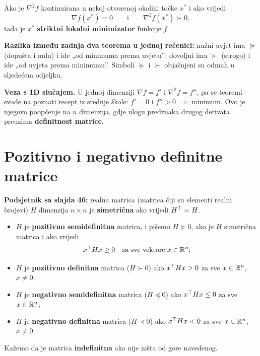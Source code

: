 \begin{teorem}
Ako je $\nabla^2f$ kontinuirana u nekoj otvorenoj okolini točke $x^{*}$ i ako
vrijedi
\[
\nabla f(x^{*}) = 0 \qquad\text{i}\qquad \nabla^2 f(x^{*}) \succ 0,
\]
tada je $x^{*}$ \textbf{striktni lokalni minimizator} funkcije $f$.
\end{teorem}

\textbf{Razlika između zadnja dva teorema u jednoj rečenici:} nužni uvjet ima
$\succeq$ (dopušta i nulu) i ide „od minimuma prema uvjetu”; dovoljni ima
$\succ$ (strogo) i ide „od uvjeta prema minimumu”. Simboli $\succeq$ i $\succ$
objašnjeni su odmah u sljedećem odjeljku.

\textbf{Veza s 1D slučajem.} U jednoj dimenziji $\nabla f = f'$ i
$\nabla^2 f = f''$, pa se teoremi svode na poznati recept iz srednje škole:
$f' = 0$ i $f'' > 0$ $\Rightarrow$ minimum. Ovo je njegovo poopćenje na $n$
dimenzija, gdje ulogu predznaka drugog derivata preuzima
\textbf{definitnost matrice}.

\section{Pozitivno i negativno definitne matrice}
\label{sec:definitnost}

\textbf{Podsjetnik sa slajda 46:} realna matrica (matrica čiji su elementi
realni brojevi) $H$ dimenzija $n \times n$ je \textbf{simetrična} ako vrijedi
$H^{\top} = H$.

\begin{definicija}[Definitnost]
\begin{itemize}
  \item $H$ je \textbf{pozitivno semidefinitna} matrica, i pišemo
        $H \succeq 0$, ako je $H$ simetrična matrica i ako vrijedi
        \[
        x^{\top} H x \ge 0 \quad\text{za sve vektore } x \in \mathbb{R}^n;
        \]
  \item $H$ je \textbf{pozitivno definitna} matrica ($H \succ 0$) ako
        $x^{\top} Hx > 0$ za sve $x \in \mathbb{R}^n$, $x \ne 0$;
  \item $H$ je \textbf{negativno semidefinitna} matrica ($H \preceq 0$) ako
        $x^{\top} Hx \le 0$ za sve $x \in \mathbb{R}^n$;
  \item $H$ je \textbf{negativno definitna} matrica ($H \prec 0$) ako
        $x^{\top} Hx < 0$ za sve $x \in \mathbb{R}^n$, $x \ne 0$.
\end{itemize}
Kažemo da je matrica \textbf{indefinitna} ako nije ništa od gore navedenog.
\end{definicija}

